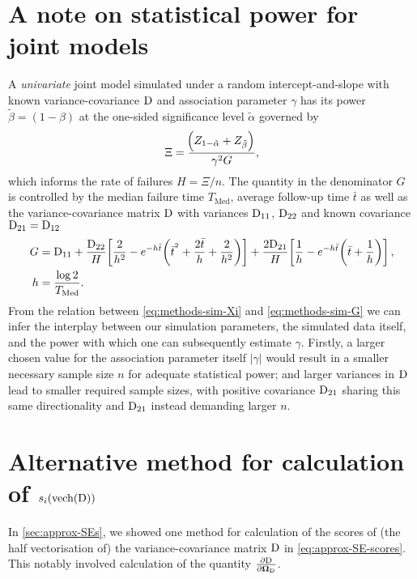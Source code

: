 \section{A note on statistical power for joint models}\label{sec:appendix-sim-considerations-power}
  A \textit{univariate} joint model simulated under a random intercept-and-slope with known variance-covariance $\mathrm{D}$ and association parameter $\gamma$ has its power $\tilde{\beta}=(1-\beta)$ at the one-sided significance level $\tilde{\alpha}$ governed by \citep{Chen2011}
  \begin{align}
      \Xi=\frac{\!\left( Z_{1-\tilde{\alpha}} + Z_{\tilde{\beta}}\right)}{\gamma^2G},
  \label{eq:methods-sim-Xi}
  \end{align}
  which informs the rate of failures $H=\Xi/n$. The quantity in the denominator $G$ is controlled by the median failure time $T_{\mathrm{Med}}$, average follow-up time $\bar{t}$ as well as the variance-covariance matrix $\mathrm{D}$ with variances $\mathrm{D}_{11}$, $\mathrm{D}_{22}$ and known covariance $\mathrm{D}_{21}=\mathrm{D}_{12}$
  \begin{equation}
      \begin{aligned}
          G&=\mathrm{D}_{11}+\frac{\mathrm{D}_{22}}{H}\!\left[\frac{2}{h^2}-e^{-h\bar{t}}\!\left(\bar{t}^{{}{^2}}+\frac{2\bar{t}}{h}+\frac{2}{h^2}\right)\right]+\frac{2\mathrm{D}_{21}}{H}\!\left[\frac{1}{h}-e^{-h\bar{t}}\!\left(\bar{t}+\frac{1}{h}\right)\right],\\
          h&=\frac{\log2}{T_{\mathrm{Med}}}.
      \end{aligned}
  \label{eq:methods-sim-G}
  \end{equation}
  From the relation between \eqref{eq:methods-sim-Xi} and \eqref{eq:methods-sim-G} we can infer the interplay between our simulation parameters, the simulated data itself, and the power with which one can subsequently estimate $\gamma$. Firstly, a larger chosen value for the association parameter itself $|\gamma|$ would result in a smaller necessary sample size $n$ for adequate statistical power; and larger variances in $\mathrm{D}$ lead to smaller required sample sizes, with positive covariance $\mathrm{D}_{21}$ sharing this same directionality and $\mathrm{D}_{21}$ instead demanding larger $n$.

\section{Alternative method for calculation of \texorpdfstring{$s_i\!\left(\text{vech}\!\left(\mathrm{D}\right)\right)$}{Dscore}}\label{sec:appendix-alt-Dscore}
In \ref{sec:approx-SEs}, we showed one method for calculation of the scores of (the half vectorisation of) the variance-covariance matrix $\mathrm{D}$ in \eqref{eq:approx-SE-scores}. This notably involved calculation of the quantity $\frac{\partial\mathrm{D}}{\partial\bm{\mathrm{\Omega}}_{\mathrm{D}}}$. 


